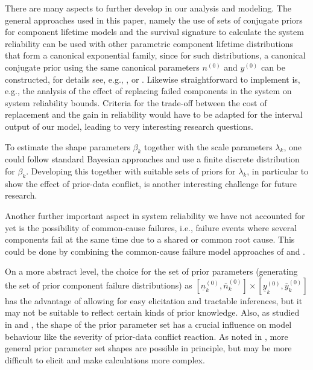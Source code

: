 \documentclass[Journal,SectionNumbers,InsideFigs]{ascelike}
\newcommand{\uz}{^{(0)}} %
\newcommand{\ul}[1]{\underline{#1}}
\newcommand{\ol}[1]{\overline{#1}}
\newcommand{\lRsys}{\ul{R}_\text{sys}}
\newcommand{\uRsys}{\ol{R}_\text{sys}}
\def\yz{y\uz}
\def\ykzl{\ul{y}\uz_k}
\def\ykzu{\ol{y}\uz_k}
\def\nz{n\uz}
\def\nkzl{\ul{n}\uz_k}
\def\nkzu{\ol{n}\uz_k}
\def\tnow{t_\text{now}}
\begin{document}
There are many aspects to further develop in our analysis and modeling.
The general approaches used in this paper,
namely the use of sets of conjugate priors for component lifetime models
and the survival signature to calculate the system reliability
can be used with other parametric component lifetime distributions
that form a canonical exponential family,
since for such distributions, a canonical conjugate prior
using the same canonical parameters $\nz$ and $\yz$ can be constructed,
for details see, e.g., , or .
%
Likewise straightforward to implement is, e.g., the analysis of the effect of replacing failed components
in the system on system reliability bounds. %
Criteria for the trade-off between the cost of replacement and the gain in reliability
would have to be adapted for the interval output of our model,
leading to very interesting research questions.

To estimate the shape parameters $\beta_k$ together with the scale parameters $\lambda_k$,
one could follow standard Bayesian approaches and use a finite discrete distribution for $\beta_k$.
Developing this together with suitable sets of priors for $\lambda_k$,
in particular to show the effect of prior-data conflict, is another interesting challenge for future research.

Another further important aspect in system reliability we have not accounted for yet
is the possibility of common-cause failures,
i.e., failure events where several components fail at the same time due to a shared or common root cause.
This could be done by combining the common-cause failure model approaches
of  and .

On a more abstract level, the choice for the set of prior parameters
(generating the set of prior component failure distributions) as $[\nkzl, \nkzu] \times [\ykzl, \ykzu]$
has the advantage of allowing for easy elicitation and tractable inferences,
but it may not be suitable to reflect certain kinds of prior knowledge.
Also, as studied in \cite{Walter2011a} and \cite[\S 3.1]{diss},
the shape of the prior parameter set has a crucial influence on model behaviour
like the severity of prior-data conflict reaction.
As noted in \cite[pp.~66f]{diss},
more general prior parameter set shapes are possible in principle,
but may be more difficult to elicit and make calculations more complex.
\end{document}
